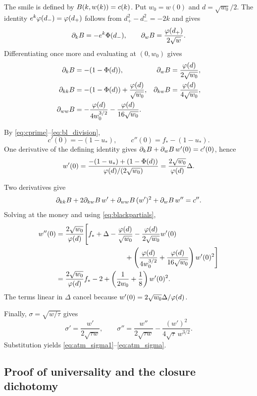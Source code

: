 The smile is defined by $B(k,w(k))=c(k)$.  Put
$w_0=w(0)$ and $d=\sqrt{w_0}/2$.  The identity
$e^k\varphi(d_-)=\varphi(d_+)$ follows from $d_+^2-d_-^2=-2k$ and gives
\[
\partial_kB=-e^k\Phi(d_-),
\qquad
\partial_wB=\frac{\varphi(d_+)}{2\sqrt w}.
\]
Differentiating once more and evaluating at $(0,w_0)$ gives
\begin{equation}
\begin{aligned}
\partial_kB&=-(1-\Phi(d)),
&\partial_wB&=\frac{\varphi(d)}{2\sqrt{w_0}},\\
\partial_{kk}B&=-(1-\Phi(d))+\frac{\varphi(d)}{\sqrt{w_0}},
&\partial_{kw}B&=\frac{\varphi(d)}{4\sqrt{w_0}},\\
\partial_{ww}B&=-\frac{\varphi(d)}{4w_0^{3/2}}
-\frac{\varphi(d)}{16\sqrt{w_0}}.
\end{aligned}
\label{eq:blackpartials}
\end{equation}

By \eqref{eq:cprime}--\eqref{eq:bl_division},
\[
c'(0)=-(1-u_*),\qquad c''(0)=f_*-(1-u_*).
\]
One derivative of the defining identity gives
$\partial_kB+\partial_wB\,w'(0)=c'(0)$, hence
\[
w'(0)=\frac{-(1-u_*)+(1-\Phi(d))}{\varphi(d)/(2\sqrt{w_0})}
=\frac{2\sqrt{w_0}}{\varphi(d)}\Delta.
\]

Two derivatives give
\[
\partial_{kk}B+2\partial_{kw}B\,w'
+\partial_{ww}B\,(w')^2+\partial_wB\,w''=c''.
\]
Solving at the money and using \eqref{eq:blackpartials},
\begin{align*}
w''(0)
&=\frac{2\sqrt{w_0}}{\phin(d)}\Bigg[
f_*+\Delta-\frac{\phin(d)}{\sqrt{w_0}}
-\frac{\phin(d)}{2\sqrt{w_0}}w'(0)\\
&\hspace{35mm}
+\left(\frac{\phin(d)}{4w_0^{3/2}}
+\frac{\phin(d)}{16\sqrt{w_0}}\right)w'(0)^2\Bigg]\\
&=\frac{2\sqrt{w_0}}{\phin(d)}f_*-2
+\left(\frac1{2w_0}+\frac18\right)w'(0)^2.
\end{align*}
The terms linear in $\Delta$ cancel because
$w'(0)=2\sqrt{w_0}\Delta/\varphi(d)$.

Finally, $\sigma=\sqrt{w/\tau}$ gives
\[
\sigma'=\frac{w'}{2\sqrt{\tau w}},
\qquad
\sigma''=\frac{w''}{2\sqrt{\tau w}}
-\frac{(w')^2}{4\sqrt\tau\,w^{3/2}}.
\]
Substitution yields \eqref{eq:atm_sigma1}--\eqref{eq:atm_sigma}.

\subsection{Proof of universality and the closure dichotomy}
\label{app:universalproof}

